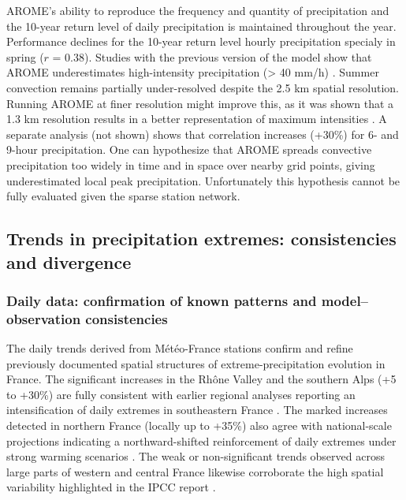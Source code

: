 \documentclass[hess, manuscript]{copernicus}
\begin{document}
AROME's ability to reproduce the frequency and quantity of precipitation and the 10-year return level of daily precipitation
is maintained throughout the year. Performance declines for the
10-year return level hourly precipitation specialy in spring ($r$ = 0.38).
Studies with the previous version of the model show that AROME underestimates high-intensity precipitation (\textgreater{} 40
mm/h) \citep{Caillaud2021,poncet2024convection}. Summer
convection remains partially under-resolved despite the 2.5 km spatial
resolution. Running AROME at finer resolution might improve this, as it was shown that a 1.3 km resolution results in a better representation of maximum intensities \citep{brousseau-etal-2016}. A separate analysis (not shown) shows that
correlation increases (+30\%) for 6- and 9-hour precipitation.
One can hypothesize that AROME spreads convective precipitation too widely in time and in space over nearby grid points, giving underestimated local peak precipitation. Unfortunately this hypothesis cannot be fully evaluated given the sparse station network. 

\subsection{Trends in precipitation extremes: consistencies and
divergence}\label{trends-in-precipitation-extremes-consistencies-divergences-and-limitations}

\subsubsection{Daily data: confirmation of known patterns and model--observation consistencies}

The daily trends derived from Météo-France stations confirm and refine previously documented spatial structures of extreme-precipitation evolution in France. The significant increases in the Rhône Valley and the southern Alps (+5 to +30\%) are fully consistent with earlier regional analyses reporting an intensification of daily extremes in southeastern France \citep{Blanchet2018,blanchet2021explaining,Ribes2019}. The marked increases detected in northern France (locally up to +35\%) also agree with national-scale projections indicating a northward-shifted reinforcement of daily extremes under strong warming scenarios \citep{soubeyroux:hal-04991790}. The weak or non-significant trends observed across large parts of western and central France likewise corroborate the high spatial variability highlighted in the IPCC report \citep{IPCC2021}.
\end{document}
